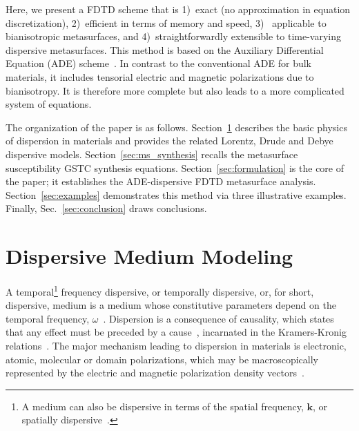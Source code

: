 \documentclass[journal]{IEEEtran}
\newcommand{\ve}[1]{\boldsymbol{#1}}
\begin{document}
Here, we present a FDTD scheme that is 1)~exact (no approximation in equation discretization), 2)~efficient in terms of memory and speed, 3)~ applicable to bianisotropic metasurfaces, and 4)~straightforwardly extensible to time-varying dispersive metasurfaces. This method is based on the Auxiliary Differential Equation (ADE) scheme~\cite{Susan_FDTD2005}. In contrast to the conventional ADE for bulk materials, it includes tensorial electric and magnetic polarizations due to bianisotropy. It is therefore more complete but also leads to a more complicated system of equations.

The organization of the paper is as follows. Section~\ref{sec:disp_ms} describes the basic physics of dispersion in materials and provides the related Lorentz, Drude and Debye dispersive models. Section~\ref{sec:ms_synthesis} recalls the metasurface susceptibility GSTC synthesis equations. Section~\ref{sec:formulation} is the core of the paper; it establishes the ADE-dispersive FDTD metasurface analysis. Section~\ref{sec:examples} demonstrates this method via three illustrative examples. Finally, Sec.~\ref{sec:conclusion} draws conclusions.

\section{Dispersive Medium Modeling}\label{sec:disp_ms}
%
A temporal\footnote{A medium can also be dispersive in terms of the spatial frequency, $\ve{k}$, or spatially dispersive~\cite{Elect_conti_media_Landau_1984}.} frequency dispersive, or temporally dispersive, or, for short, dispersive, medium is a medium whose constitutive parameters depend on the temporal frequency, $\omega$~\cite{Jackson_Classical_Electd2012}. Dispersion is a consequence of causality, which states that any effect must be preceded by a cause~\cite{Nussensveig_caus_disp2012},
 incarnated in the Kramers-Kronig relations~\cite{Jackson_Classical_Electd2012}. The major mechanism leading to dispersion in materials is electronic, atomic, molecular or domain polarizations, which may be macroscopically represented by the electric and magnetic polarization density vectors~\cite{Ishimaru_EM_Radia_Propag_Book1991}.
\end{document}
